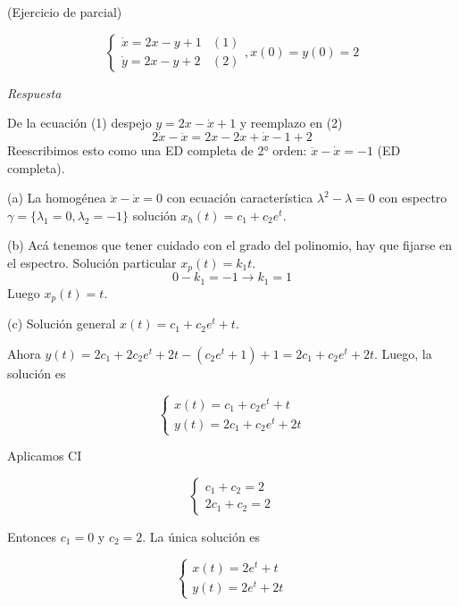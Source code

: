 \begin{exercise}

(Ejercicio de parcial)

\begin{equation}
\begin{cases}
	\dot{x} = 2x - y + 1 & (1) \\
	\dot{y} = 2x - y + 2 & (2)
\end{cases}, x(0) = y(0) = 2
\end{equation}

\emph{Respuesta}

De la ecuaci\'on (1) despejo $y = 2x - \dot{x} + 1$ y reemplazo en (2)
$$
2\dot{x} - \ddot{x} = 2x - 2x + \dot{x} -1 + 2
$$
Reescribimos esto como una ED completa de 2° orden: $\ddot{x} - \dot{x} = -1$ (ED completa).

(a) La homog\'enea $\ddot{x} - \dot{x} = 0$ con ecuaci\'on caracter\'istica $\lambda^2 - \lambda = 0$ con espectro $\gamma = \lbrace \lambda_1 = 0, \lambda_2 = -1 \rbrace$ soluci\'on $x_h(t) = c_1 + c_2 e^t$.

(b) Ac\'a tenemos que tener cuidado con el grado del polinomio, hay que fijarse en el espectro. Soluci\'on particular $x_p(t) = k_1t$. $$0 - k_1 = -1 \rightarrow k_1 = 1$$ Luego $x_p(t) = t$.

(c) Soluci\'on general $x(t) = c_1 + c_2e^t + t$.

Ahora $y(t) = 2c_1 + 2c_2 e^t + 2t - (c_2 e^t + 1) + 1 = 2c_1 +c_2 e^t + 2t$. Luego, la soluci\'on es

\begin{equation}
\begin{cases}
	x(t) = c_1 + c_2 e^t + t \\
	y(t) = 2c_1 + c_2 e^t + 2t
\end{cases}
\end{equation}

Aplicamos CI

\begin{equation}
\begin{cases}
	c_1 + c_2 = 2 \\
	2c_1 + c_2 = 2
\end{cases}
\end{equation}

Entonces $c_1 = 0$ y $c_2 = 2$. La \'unica soluci\'on es

\begin{equation}
\begin{cases}
	x(t) = 2e^t + t \\
	y(t) = 2e^t + 2t
\end{cases}
\end{equation}

\end{exercise}

